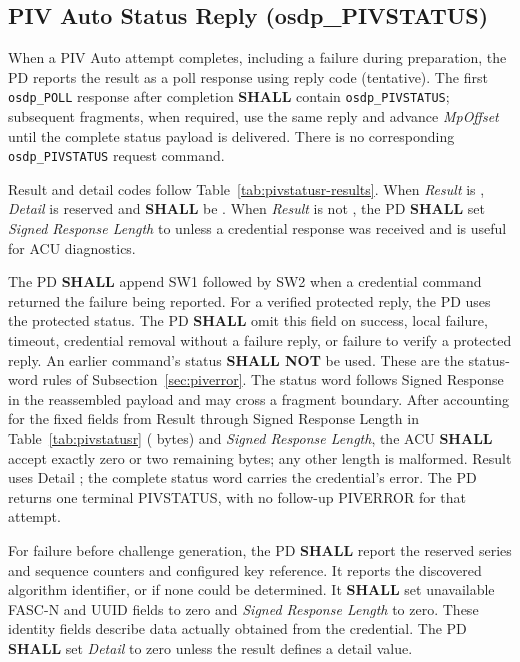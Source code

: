 \subsection{PIV Auto Status Reply (osdp\_PIVSTATUS)}

When a PIV Auto attempt completes, including a failure during preparation, the
PD reports the result as a poll response using reply code  (tentative).
The first \texttt{osdp\_POLL} response after completion \textbf{SHALL} contain
\texttt{osdp\_PIVSTATUS}; subsequent fragments, when required, use the same reply
and advance \emph{MpOffset} until the complete status payload is delivered.
There is no corresponding \texttt{osdp\_PIVSTATUS} request command.



Result and detail codes follow Table~\ref{tab:pivstatusr-results}. When \emph{Result} is , \emph{Detail} is reserved and \textbf{SHALL} be . When \emph{Result} is not , the PD \textbf{SHALL} set \emph{Signed Response Length} to  unless a credential response was received and is useful for ACU diagnostics.

The PD \textbf{SHALL} append SW1 followed by SW2 when a credential command
returned the failure being reported. For a verified protected reply, the PD
uses the protected status. The PD \textbf{SHALL} omit this field on success,
local failure, timeout, credential removal without a failure reply, or failure
to verify a protected reply. An earlier command's status \textbf{SHALL NOT}
be used. These are the status-word rules of Subsection~\ref{sec:piverror}.
The status word follows Signed Response in the reassembled payload and may
cross a fragment boundary. After accounting for the fixed fields from Result
through Signed Response Length in Table~\ref{tab:pivstatusr} ( bytes) and
\emph{Signed Response Length}, the ACU \textbf{SHALL} accept exactly zero or
two remaining bytes; any other length is malformed. Result  uses
Detail ; the complete status word carries the credential's error.
The PD returns one terminal PIVSTATUS, with no follow-up PIVERROR for that attempt.



For failure before challenge generation, the PD \textbf{SHALL} report the
reserved series and sequence counters and configured key reference. It reports the
discovered algorithm identifier, or  if none could be determined.
It \textbf{SHALL} set unavailable FASC-N and UUID fields to zero and
\emph{Signed Response Length} to zero. These identity fields describe data
actually obtained from the credential. The PD \textbf{SHALL} set \emph{Detail}
to zero unless the result defines a detail value.

